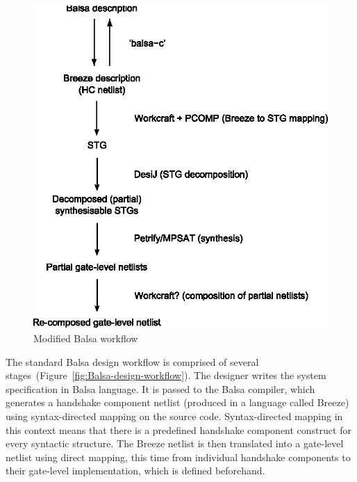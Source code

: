 \begin{figure}
\begin{centering}
\includegraphics[width=0.45\paperwidth]{figures/balsa-workflow-modification}
\par\end{centering}

\caption{Modified Balsa workflow\label{fig:Modified-Balsa-workflow}}
\end{figure}


The standard Balsa design workflow is comprised of several stages~(Figure~\ref{fig:Balsa-design-workflow}).
The designer writes the system specification in Balsa language. It
is passed to the Balsa compiler, which generates a handshake component
netlist (produced in a language called Breeze) using syntax-directed
mapping on the source code. Syntax-directed mapping in this context
means that there is a predefined handshake component construct for
every syntactic structure. The Breeze netlist is then translated into
a gate-level netlist using direct mapping, this time from individual
handshake components to their gate-level implementation, which is
defined beforehand.

